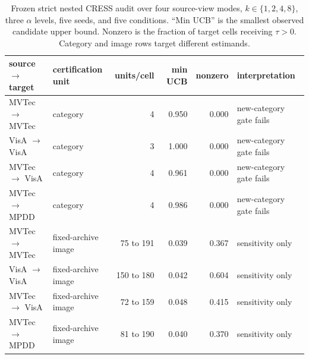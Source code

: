 \begin{table}[t]
\centering
\caption{Frozen strict nested CRESS audit over four source-view modes, $k\in\{1,2,4,8\}$, three $\alpha$ levels, five seeds, and five conditions. ``Min UCB'' is the smallest observed candidate upper bound. Nonzero is the fraction of target cells receiving $\tau>0$. Category and image rows target different estimands.}
\label{tab:strict-nested-sc3r}
\footnotesize
\setlength{\tabcolsep}{5pt}
\begin{tabular}{llrrrl}
\toprule
source $\rightarrow$ target & certification unit & units/cell & min UCB & nonzero & interpretation \\
\midrule
MVTec $\rightarrow$ MVTec & category & 4 & 0.950 & 0.000 & new-category gate fails \\
VisA $\rightarrow$ VisA & category & 3 & 1.000 & 0.000 & new-category gate fails \\
MVTec $\rightarrow$ VisA & category & 4 & 0.961 & 0.000 & new-category gate fails \\
MVTec $\rightarrow$ MPDD & category & 4 & 0.986 & 0.000 & new-category gate fails \\
\midrule
MVTec $\rightarrow$ MVTec & fixed-archive image & 75 to 191 & 0.039 & 0.367 & sensitivity only \\
VisA $\rightarrow$ VisA & fixed-archive image & 150 to 180 & 0.042 & 0.604 & sensitivity only \\
MVTec $\rightarrow$ VisA & fixed-archive image & 72 to 159 & 0.048 & 0.415 & sensitivity only \\
MVTec $\rightarrow$ MPDD & fixed-archive image & 81 to 190 & 0.040 & 0.370 & sensitivity only \\
\bottomrule
\end{tabular}
\end{table}
